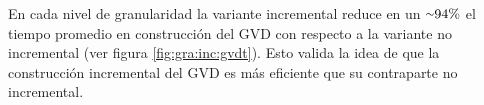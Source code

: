 En cada nivel de granularidad la variante incremental reduce en un
${\smallsim}94\%$ el tiempo promedio en construcción del GVD con respecto a la
variante no incremental (ver figura \ref{fig:gra:inc:gvdt}). Esto valida la idea de que la construcción incremental
del GVD es más eficiente que su contraparte no incremental.


